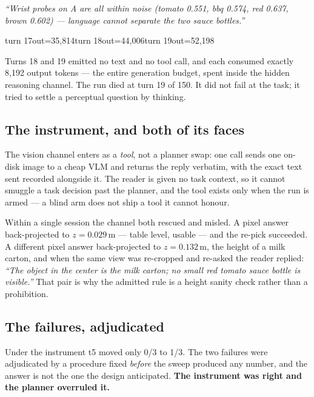 \documentclass[11pt,a4paper]{article}
\begin{document}
\begin{evidence}[title={Blind session, model output at turn 16, then turns 18--19}]
\small
\emph{``Wrist probes on A are all within noise (tomato 0.551, bbq 0.574, red
0.637, brown 0.602) --- language cannot separate the two sauce bottles.''}

\medskip
\ttfamily\footnotesize
turn 17\quad out=35{,}814\qquad turn 18\quad out=44{,}006\qquad turn 19\quad out=52{,}198
\end{evidence}

\noindent
Turns 18 and 19 emitted no text and no tool call, and each consumed exactly
8{,}192 output tokens --- the entire generation budget, spent inside the hidden
reasoning channel. The run died at turn 19 of 150. It did not fail at the task;
it tried to settle a perceptual question by thinking.

\subsection{The instrument, and both of its faces}

The vision channel enters as a \emph{tool}, not a planner swap: one call sends
one on-disk image to a cheap VLM and returns the reply verbatim, with the exact
text sent recorded alongside it. The reader is given no task context, so it
cannot smuggle a task decision past the planner, and the tool exists only when
the run is armed --- a blind arm does not ship a tool it cannot honour.

Within a single session the channel both rescued and misled. A pixel answer
back-projected to $z=0.029$\,m --- table level, usable --- and the re-pick
succeeded. A different pixel answer back-projected to $z=0.132$\,m, the height
of a milk carton, and when the same view was re-cropped and re-asked the reader
replied: \emph{``The object in the center is the milk carton; no small red
tomato sauce bottle is visible.''} That pair is why the admitted rule is a
height sanity check rather than a prohibition.

\subsection{The failures, adjudicated}

Under the instrument t5 moved only 0/3 to 1/3. The two failures were adjudicated
by a procedure fixed \emph{before} the sweep produced any number, and the answer
is not the one the design anticipated. \textbf{The instrument was right and the
planner overruled it.}
\end{document}
